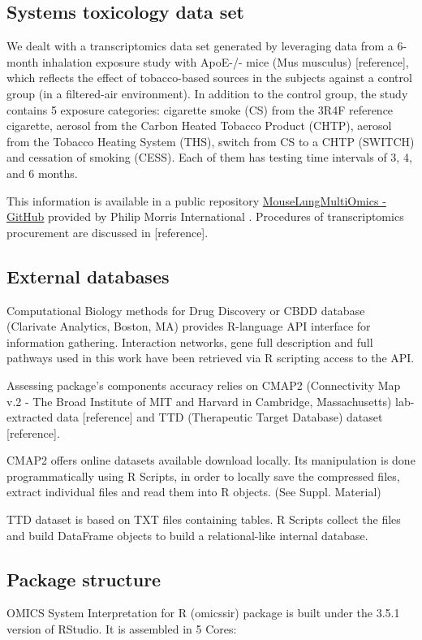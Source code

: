 \subsection{Systems toxicology data set}
We dealt with a transcriptomics data set generated by leveraging data from a 6-month inhalation exposure study with ApoE-/- mice (Mus musculus) [reference], which reflects the effect of tobacco-based sources in the subjects against a control group (in a filtered-air environment). In addition to the control group, the study contains 5 exposure categories: cigarette smoke (CS) from the 3R4F reference cigarette, aerosol from the Carbon Heated Tobacco Product (CHTP), aerosol from the Tobacco Heating System (THS), switch from CS to a CHTP (SWITCH) and cessation of smoking (CESS). Each of them has testing time intervals of 3, 4, and 6 months.


This information is available in a public repository \href{https://github.com/philipmorrisintl/MouseLungMultiOmics}{MouseLungMultiOmics - GitHub} provided by Philip Morris International \cite{Titz2020Multi-omicsSmoke}. Procedures of transcriptomics procurement are discussed in [reference].


\subsection{External databases}
Computational Biology methods for Drug Discovery or CBDD database (Clarivate Analytics, Boston, MA) provides R-language API interface for information gathering. Interaction networks, gene full description and full pathways used in this work have been retrieved via R scripting access to the API.

Assessing package’s components accuracy relies on CMAP2 (Connectivity Map v.2 - The Broad Institute of MIT and Harvard in Cambridge, Massachusetts) lab-extracted data [reference] and TTD (Therapeutic Target Database) dataset [reference].


CMAP2 offers online datasets available download locally. Its manipulation is done programmatically using R Scripts, in order to locally save the compressed files, extract individual files and read them into R objects. (See Suppl. Material)


TTD dataset is based on TXT files containing tables. R Scripts collect the files and build DataFrame objects to build a relational-like internal database.


\subsection{Package structure}
OMICS System Interpretation for R (omicssir) package is built under the 3.5.1 version of RStudio. It is assembled in 5 Cores:


